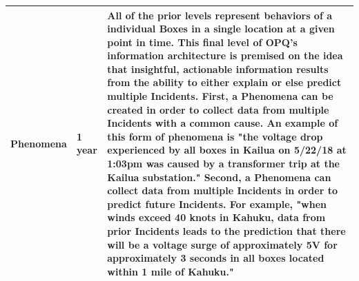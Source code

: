 \begin{table}[H]
\begin{tabular}{llp{4in}}
Phenomena & 1 year & All of the prior levels represent behaviors of a individual Boxes in a single location at a given point in time. This final level of OPQ's information architecture is premised on the idea that insightful, actionable information results from the ability to either explain or else predict multiple Incidents. First, a Phenomena can be created in order to collect data from multiple Incidents with a common cause. An example of this form of phenomena is "the voltage drop experienced by all boxes in Kailua on 5/22/18 at 1:03pm was caused by a transformer trip at the Kailua substation." Second, a Phenomena can collect data from multiple Incidents in order to predict future Incidents. For example, "when winds exceed 40 knots in Kahuku, data from prior Incidents leads to the prediction that there will be a voltage surge of approximately 5V for approximately 3 seconds in all boxes located within 1 mile of Kahuku."\\
\bottomrule
\end{tabular}
\label{fig:information-architecture}
\end{table}




